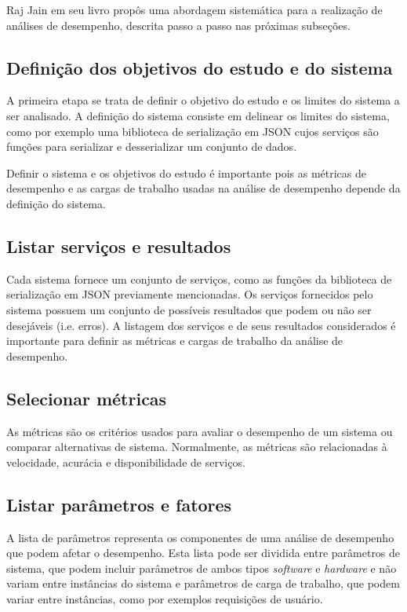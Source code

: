 Raj Jain em seu livro \cite{jain1991art} propôs uma abordagem sistemática para a realização de análises de desempenho, descrita passo a passo nas próximas subseções.

\subsection{Definição dos objetivos do estudo e do sistema}

A primeira etapa se trata de definir o objetivo do estudo e os limites do sistema a ser analisado. A definição do sistema consiste em delinear os limites do sistema, como por exemplo uma biblioteca de serialização em JSON cujos serviços são funções para serializar e desserializar um conjunto de dados.

Definir o sistema e os objetivos do estudo é importante pois as métricas de desempenho e as cargas de trabalho usadas na análise de desempenho depende da definição do sistema.

\subsection{Listar serviços e resultados}

Cada sistema fornece um conjunto de serviços, como as funções da biblioteca de serialização em JSON previamente mencionadas. Os serviços fornecidos pelo sistema possuem um conjunto de possíveis resultados que podem ou não ser desejáveis (i.e. erros). A listagem dos serviços e de seus resultados considerados é importante para definir as métricas e cargas de trabalho da análise de desempenho.

\subsection{Selecionar métricas}

As métricas são os critérios usados para avaliar o desempenho de um sistema ou comparar alternativas de sistema. Normalmente, as métricas são relacionadas à velocidade, acurácia e disponibilidade de serviços.

\subsection{Listar parâmetros e fatores}

A lista de parâmetros representa os componentes de uma análise de desempenho que podem afetar o desempenho. Esta lista pode ser dividida entre parâmetros de sistema, que podem incluir parâmetros de ambos tipos \textit{software} e \textit{hardware} e não variam entre instâncias do sistema e parâmetros de carga de trabalho, que podem variar entre instâncias, como por exemplos requisições de usuário.

